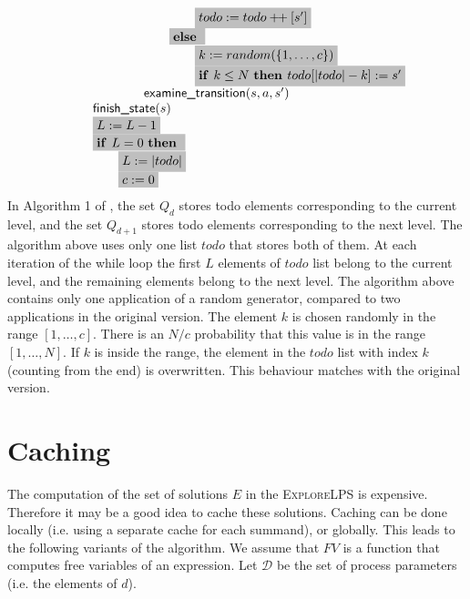 \documentclass{article}
\newcommand{\concat}{\ensuremath{+\!\!+\:}}
\newcommand{\If}{\text{\textbf{if }}}
\newcommand{\Then}{\text{\textbf{then }}}
\newcommand{\Else}{\text{\textbf{else }}}
\begin{document}
\[\begin{tabular}{l}
\qquad \qquad \qquad \qquad \qquad \colorbox{lightgray}{$todo := todo \concat [s']$} \\
\qquad \qquad \qquad \qquad \colorbox{lightgray}{\Else} \\
\qquad \qquad \qquad \qquad \qquad \colorbox{lightgray}{$k := random(\{ 1, \ldots, c\})$} \\
\qquad \qquad \qquad \qquad \qquad \colorbox{lightgray}{\If $k \leq N$ \Then $todo[|todo| - k] := s'$} \\
\qquad \qquad \qquad $\textsf{examine\_transition}(s, a, s')$ \\
\qquad $\textsf{finish\_state}(s)$ \\
\qquad \colorbox{lightgray}{$L := L - 1$} \\
\qquad \colorbox{lightgray}{\If $L = 0$ \Then} \\
\qquad \qquad \colorbox{lightgray}{$L := |todo|$} \\
\qquad \qquad \colorbox{lightgray}{$c := 0$}
\end{tabular}
\]
In Algorithm 1 of \cite{DBLP:journals/jlp/EngelsGWW09}, the set $Q_d$ stores todo elements corresponding to the current level, and the set $Q_{d+1}$ stores todo elements corresponding to the next level. The algorithm above uses only one list $todo$ that stores both of them. At each iteration of the while loop the first $L$ elements of $todo$ list belong to the current level, and the remaining elements belong to the next level. The algorithm above contains only one application of a random generator, compared to two applications in the original version. The element $k$ is chosen randomly in the range $[1, \ldots, c]$. There is an $N/c$ probability that this value is in the range $[1, \ldots, N]$. If $k$ is inside the range, the element in the $todo$ list with index $k$ (counting from the end) is overwritten. This behaviour matches with the original version.

\newpage
\section{Caching}
The computation of the set of solutions $E$ in the \textsc{ExploreLPS} is expensive. Therefore it may be a good idea to cache these solutions. Caching can be done locally (i.e. using a separate cache for each summand),
or globally. This leads to the following variants of the algorithm. We assume that $FV$ is a function that
computes free variables of an expression. Let $\mathcal{D}$ be the set of process parameters
(i.e. the elements of $d$).
\end{document}
